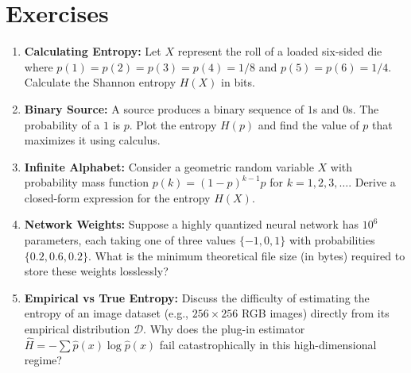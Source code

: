 \section*{Exercises}
\begin{enumerate}
    \item \textbf{Calculating Entropy:} Let $X$ represent the roll of a loaded six-sided die where $p(1)=p(2)=p(3)=p(4)=1/8$ and $p(5)=p(6)=1/4$. Calculate the Shannon entropy $H(X)$ in bits.
    \item \textbf{Binary Source:} A source produces a binary sequence of $1$s and $0$s. The probability of a $1$ is $p$. Plot the entropy $H(p)$ and find the value of $p$ that maximizes it using calculus.
    \item \textbf{Infinite Alphabet:} Consider a geometric random variable $X$ with probability mass function $p(k) = (1-p)^{k-1}p$ for $k = 1, 2, 3, \dots$. Derive a closed-form expression for the entropy $H(X)$. 
    \item \textbf{Network Weights:} Suppose a highly quantized neural network has $10^6$ parameters, each taking one of three values $\{-1, 0, 1\}$ with probabilities $\{0.2, 0.6, 0.2\}$. What is the minimum theoretical file size (in bytes) required to store these weights losslessly?
    \item \textbf{Empirical vs True Entropy:} Discuss the difficulty of estimating the entropy of an image dataset (e.g., $256 \times 256$ RGB images) directly from its empirical distribution $\mathcal{D}$. Why does the plug-in estimator $\hat{H} = -\sum \hat{p}(x)\log \hat{p}(x)$ fail catastrophically in this high-dimensional regime?
\end{enumerate}
